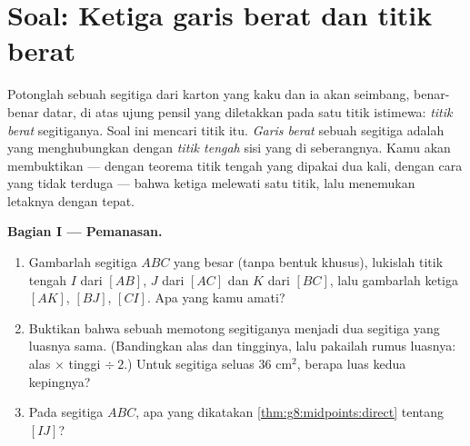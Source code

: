 \section{Soal: Ketiga garis berat dan titik berat}

\begin{problem}
\label{pb:g8:midpoints:1}
Potonglah sebuah segitiga dari karton yang kaku dan ia akan
seimbang, benar-benar datar, di atas ujung pensil yang diletakkan
pada satu titik istimewa: \emph{titik berat}
segitiganya. Soal ini mencari titik itu. \emph{Garis berat} sebuah segitiga adalah  yang menghubungkan  dengan \emph{titik tengah} sisi yang di seberangnya. Kamu akan
membuktikan --- dengan teorema titik tengah yang dipakai dua kali,
dengan cara yang tidak terduga --- bahwa ketiga 
melewati satu titik, lalu menemukan letaknya dengan tepat.

\medskip
\noindent\textbf{Bagian I --- Pemanasan.}
\begin{enumerate}
  \item Gambarlah segitiga $ABC$ yang besar (tanpa bentuk khusus),
        lukislah titik tengah $I$ dari $[AB]$, $J$ dari $[AC]$ dan $K$
        dari $[BC]$, lalu gambarlah ketiga  $[AK]$,
        $[BJ]$, $[CI]$. Apa yang kamu amati?
  \item Buktikan bahwa sebuah  memotong segitiganya
        menjadi dua segitiga yang luasnya sama. (Bandingkan alas dan
        tingginya, lalu pakailah rumus luasnya: alas $\times$ tinggi
        $\div\ 2$.) Untuk segitiga seluas $36$ cm$^2$, berapa luas
        kedua kepingnya?
  \item Pada segitiga $ABC$, apa yang dikatakan
        \cref{thm:g8:midpoints:direct} tentang 
        $[IJ]$?
\end{enumerate}


\end{problem}
